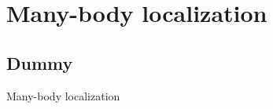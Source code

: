 \section{Many-body localization}
\subsection{Dummy}

\begin{frame}{Many-body localization}

\end{frame}
